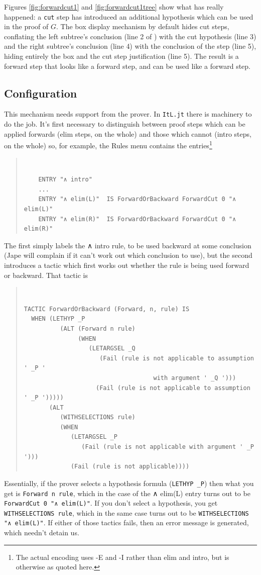 \documentclass[11pt]{article}
\newenvironment{japeish}{\begin{quote}\tt\small}{\end{quote}}
\newcommand{\textj}[1]{{\tt\small{#1}}}
\begin{document}
Figures \ref{fig:forwardcut1} and \ref{fig:forwardcut1tree} show what has really happened: a \textj{cut} step has introduced an additional hypothesis which can be used in the proof of $G$. The box display mechanism by default hides cut steps, conflating the left subtree's conclusion (line 2 of ) with the cut hypothesis (line 3) and the right subtree's conclusion (line 4) with the conclusion of the step (line 5), hiding entirely the box and the cut step justification (line 5). The result is a forward step that looks like a forward step, and can be used like a forward step.

\subsection{Configuration}
\label{sec:firstforwardstepsconfig}

This mechanism needs support from the prover. In \textj{ItL.jt} there is machinery to do the job. It's first necessary to distinguish between proof steps which can be applied forwards (elim steps, on the whole) and those which cannot (intro steps, on the whole) so, for example, the Rules menu contains the entries\footnote{The actual encoding uses -E and -I rather than elim and intro, but is otherwise as quoted here.}
\begin{japeish}
\begin{verbatim}
    ENTRY "∧ intro" 
    ...
    ENTRY "∧ elim(L)"  IS ForwardOrBackward ForwardCut 0 "∧ elim(L)"
    ENTRY "∧ elim(R)"  IS ForwardOrBackward ForwardCut 0 "∧ elim(R)"
\end{verbatim}
\end{japeish}
The first simply labels the ∧ intro rule, to be used backward at some conclusion (Jape will complain if it can't work out which conclusion to use), but the second introduces a tactic which first works out whether the rule is being used forward or backward. That tactic is
\begin{japeish}
\begin{verbatim}
TACTIC ForwardOrBackward (Forward, n, rule) IS 
  WHEN (LETHYP _P 
          (ALT (Forward n rule)
               (WHEN   
                  (LETARGSEL _Q 
                     (Fail (rule is not applicable to assumption ' _P ' 
                                    with argument ' _Q ')))
                    (Fail (rule is not applicable to assumption ' _P ')))))
       (ALT    
          (WITHSELECTIONS rule)
          (WHEN   
             (LETARGSEL _P
                (Fail (rule is not applicable with argument ' _P ')))
             (Fail (rule is not applicable))))
\end{verbatim}
\end{japeish}
Essentially, if the prover selects a hypothesis formula (\textj{LETHYP \_P}) then what you get is \textj{Forward n rule}, which in the case of the ∧ elim(L) entry turns out to be \textj{ForwardCut 0 "∧ elim(L)"}. If you don't select a hypothesis, you get \textj{WITHSELECTIONS rule}, which in the same case turns out to be \textj{WITHSELECTIONS "∧ elim(L)"}. If either of those tactics fails, then an error message is generated, which needn't detain us.
\end{document}
